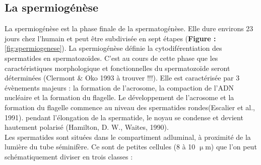 \documentclass[12pt,twoside]{reedthesis}
\theoremstyle{definition}
\theoremstyle{definition}
\theoremstyle{remark}
\begin{document}
  \subsection{La spermiogénèse}\label{la-spermiogenese}
  
  La spermiogénèse est la phase finale de la spermatogénèse. Elle dure
  environs 23 jours chez l'humain et peut être subdivisée en sept étapes
  (\textbf{Figure : }\ref{fig:spermiogenese}). La spermiogénèse définie la
  cytodiférentiation des spermatides en spermatozoïdes. C'est au cours de
  cette phase que les caractéristiques morphologique et fonctionnelles du
  spermatozoïde seront déterminées (Clermont \& Oko 1993 à trouver !!!).
  Elle est caractérisée par 3 évènements majeurs : la formation de
  l'acrosome, la compaction de l'ADN nucléaire et la formation du
  flagelle. Le développement de l'acrosome et la formation du flagelle
  commence au niveau des spermatides rondes(Escalier et al., 1991).
  pendant l'élongation de la spermatide, le noyau se condense et devient
  hautement polarisé (Hamilton, D. W., Waites, 1990).\\
  Les spermatides sont situées dans le compartiment adluminal, à proximité
  de la lumière du tube séminifère. Ce sont de petites cellules (8 à 10
  \(\upmu\)m) que l'on peut schématiquement diviser en trois classes :
  
\end{document}
